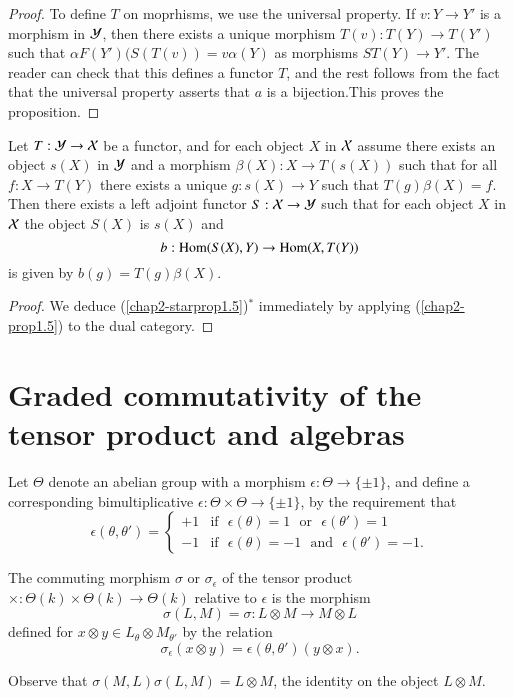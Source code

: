 \begin{proof}
To define $T$ on moprhisms, we use the universal property. If $v:Y\to
Y'$ is a morphism in $\mathcal{Y}$, then there exists a unique morphism
$T(v):T(Y)\to T(Y')$ such that $\alpha F(Y')(S(T(v))=v\alpha(Y)$ as
morphisms $ST(Y)\to Y'$. The reader can check that this defines a
functor $T$, and the rest follows from the fact that the universal
property asserts that $a$ is a bijection.\pageoriginale This proves
the proposition.
\end{proof}

\setcounter{starprop}{4}
\begin{starprop}\label{chap2-starprop1.5}
Let $T:\mathcal{Y}\to \mathcal{X}$ be a functor, and for each object $X$ in $\mathcal{X}$ assume
there exists an object $s(X)$ in $\mathcal{Y}$ and a morphism $\beta(X):X\to
T(s(X))$ such that for all $f:X\to T(Y)$ there exists a unique
$g:s(X)\to Y$ such that $T(g)\beta(X)=f$. Then there exists a left
adjoint functor $S:\mathcal{X}\to \mathcal{Y}$ such that for each object $X$ in $\mathcal{X}$ the
object $S(X)$ is $s(X)$ and 
$$
b:\operatorname{Hom}(S(X),Y)\to \operatorname{Hom}(X,T(Y))
$$
is given by $b(g)=T(g)\beta(X)$. 
\end{starprop}

\begin{proof}
We deduce (\ref{chap2-starprop1.5})$^{*}$ immediately by applying
(\ref{chap2-prop1.5}) to the dual category.
\end{proof}

\section{Graded commutativity of the tensor product and
  algebras}\label{chap2-sec2} 

Let $\Theta$ denote an abelian group with a morphism
$\epsilon:\Theta\to \{\pm 1\}$, and define a corresponding
bimultiplicative $\epsilon:\Theta\times\Theta\to \{\pm 1\}$, by the
requirement that
$$
\epsilon(\theta,\theta')=
\begin{cases}
+1 & \text{if~ } \epsilon(\theta)=1\text{~ or~ }\epsilon(\theta')=1\\
-1 & \text{if~ } \epsilon(\theta)=-1\text{~ and~ } \epsilon(\theta')=-1.
\end{cases}
$$

\begin{definition}\label{chap2-defi2.1}
The commuting morphism $\sigma$ or $\sigma_{\epsilon}$ of the tensor
product $\times:\Theta(k)\times \Theta(k)\to \Theta(k)$ relative to
$\epsilon$ is the morphism
$$
\sigma(L,M)=\sigma:L\otimes M\to M\otimes L
$$
defined for $x\otimes y\in L_{\theta}\otimes M_{\theta'}$ by the
relation
$$
\sigma_{\epsilon}(x\otimes y)=\epsilon(\theta,\theta')(y\otimes x).
$$

Observe that $\sigma(M,L)\sigma(L,M)=L\otimes M$, the identity on the
object $L\otimes M$.
\end{definition}

